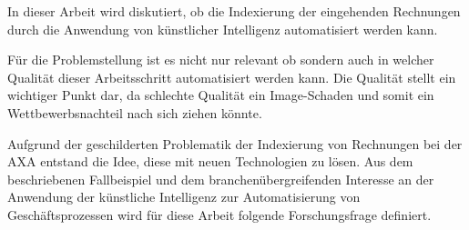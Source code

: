 \documentclass{hwz}
\begin{document}
In dieser Arbeit wird diskutiert, ob die Indexierung der eingehenden Rechnungen durch die Anwendung von künstlicher Intelligenz automatisiert werden kann.

Für die Problemstellung ist es nicht nur relevant ob sondern auch in welcher Qualität dieser Arbeitsschritt automatisiert werden kann. Die Qualität stellt ein wichtiger Punkt dar, da schlechte Qualität ein Image-Schaden und somit ein Wettbewerbsnachteil nach sich ziehen könnte.

Aufgrund der geschilderten Problematik der Indexierung von Rechnungen bei der AXA entstand die Idee, diese mit neuen Technologien zu lösen. Aus dem beschriebenen Fallbeispiel und dem branchenübergreifenden Interesse an der Anwendung der künstliche Intelligenz zur Automatisierung von Geschäftsprozessen wird für diese Arbeit folgende Forschungsfrage definiert.\newline\newline
{
    \medskip
    \setlength{\fboxsep}{1em}
    \noindent{}
    \medskip
}




\end{document}
